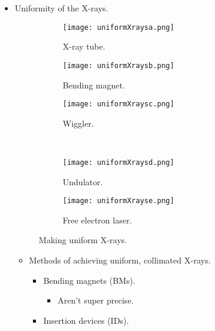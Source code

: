 \documentclass[../notes.tex]{subfiles}
\begin{document}
\begin{itemize}
\begin{itemize}
    \end{itemize}
    \item Uniformity of the X-rays.
    \begin{figure}[h!]
        \centering
        \begin{subfigure}[b]{0.33\linewidth}
            \centering
            \texttt{[image: uniformXraysa.png]}
            \caption{X-ray tube.}
            \label{fig:uniformXraysa}
        \end{subfigure}
        \begin{subfigure}[b]{0.32\linewidth}
            \centering
            \texttt{[image: uniformXraysb.png]}
            \caption{Bending magnet.}
            \label{fig:uniformXraysb}
        \end{subfigure}
        \begin{subfigure}[b]{0.33\linewidth}
            \centering
            \texttt{[image: uniformXraysc.png]}
            \caption{Wiggler.}
            \label{fig:uniformXraysc}
        \end{subfigure}\\[2em]
        \begin{subfigure}[b]{0.33\linewidth}
            \centering
            \texttt{[image: uniformXraysd.png]}
            \caption{Undulator.}
            \label{fig:uniformXraysd}
        \end{subfigure}
        \begin{subfigure}[b]{0.33\linewidth}
            \centering
            \texttt{[image: uniformXrayse.png]}
            \caption{Free electron laser.}
            \label{fig:uniformXrayse}
        \end{subfigure}
        \caption{Making uniform X-rays.}
        \label{fig:uniformXrays}
    \end{figure}
    \begin{itemize}
        \item Methods of achieving uniform, collimated X-rays.
        \begin{itemize}
            \item Bending magnets (BMs).
            \begin{itemize}
                \item Aren't super precise.
            \end{itemize}
            \item Insertion devices (IDs).
            \begin{itemize}

\end{itemize}
\end{itemize}
\end{itemize}
\end{itemize}
\end{document}
